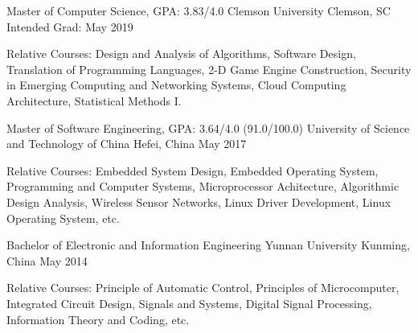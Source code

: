 

\begin{resumeeducations}

  \resumeeducation
    {Master of Computer Science, GPA: 3.83/4.0} %
    {Clemson University} %
    {Clemson, SC} %
    {Intended Grad: May 2019} %
    {
      \begin{cvitems} %
        \item {Relative Courses: Design and Analysis of Algorithms, Software Design, Translation of Programming Languages, 2-D Game Engine Construction, Security in Emerging Computing and Networking Systems, Cloud Computing Architecture, Statistical Methods I.}
      \end{cvitems}
    }

  \resumeeducation
    {Master of Software Engineering, GPA: 3.64/4.0 (91.0/100.0)} %
    {University of Science and Technology of China} %
    {Hefei, China} %
    {May 2017} %
    {
      \begin{cvitems} %
        \item {Relative Courses: Embedded System Design, Embedded Operating System, Programming and Computer Systems, Microprocessor Achitecture, Algorithmic Design Analysis, Wireless Sensor Networks, Linux Driver Development, Linux Operating System, etc.}
      \end{cvitems}
    }

  \resumeeducation
    {Bachelor of Electronic and Information Engineering} %
    {Yunnan University} %
    {Kunming, China} %
    {May 2014} %
    {
      \begin{cvitems} %
        \item {Relative Courses: Principle of Automatic Control, Principles of Microcomputer, Integrated Circuit Design, Signals and Systems, Digital Signal Processing, Information Theory and Coding, etc.}
      \end{cvitems}
    }

\end{resumeeducations}
